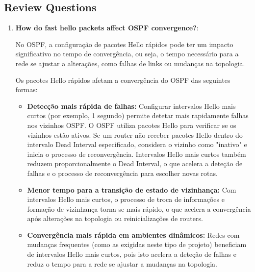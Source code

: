 \documentclass[11pt,english, openright, oneside]{book}
\begin{document}
\pagebreak
\subsection{Review Questions}

\begin{enumerate}
  \item \textbf{How do fast hello packets affect OSPF convergence?}:
  \vspace{0.2cm}

  \par No OSPF, a configuração de pacotes Hello rápidos pode ter um impacto significativo no tempo de convergência, ou seja, o tempo necessário para a rede se ajustar a alterações, como falhas de links ou mudanças na topologia.
  \vspace{0.2cm}

  \par Os pacotes Hello rápidos afetam a convergência do OSPF das seguintes formas:
  \vspace{0.2cm}

  \begin{itemize}
    \item \textbf{Detecção mais rápida de falhas:}  Configurar intervalos Hello mais curtos (por exemplo, 1 segundo) permite detetar mais rapidamente falhas nos vizinhos OSPF. O OSPF utiliza pacotes Hello para verificar se os vizinhos estão ativos. Se um router não receber pacotes Hello dentro do intervalo Dead Interval especificado, considera o vizinho como "inativo" e inicia o processo de reconvergência. Intervalos Hello mais curtos também reduzem proporcionalmente o Dead Interval, o que acelera a deteção de falhas e o processo de reconvergência para escolher novas rotas.
    \vspace{0.2cm}

    \item \textbf{Menor tempo para a transição de estado de vizinhança:} Com intervalos Hello mais curtos, o processo de troca de informações e formação de vizinhança torna-se mais rápido, o que acelera a convergência após alterações na topologia ou reinicializações de routers.
    \vspace{0.2cm}

    \item \textbf{Convergência mais rápida em ambientes dinâmicos:} Redes com mudanças frequentes (como as exigidas neste tipo de projeto) beneficiam de intervalos Hello mais curtos, pois isto acelera a deteção de falhas e reduz o tempo para a rede se ajustar a mudanças na topologia.
  \end{itemize}
  \vspace{0.2cm}


\end{enumerate}
\end{document}

